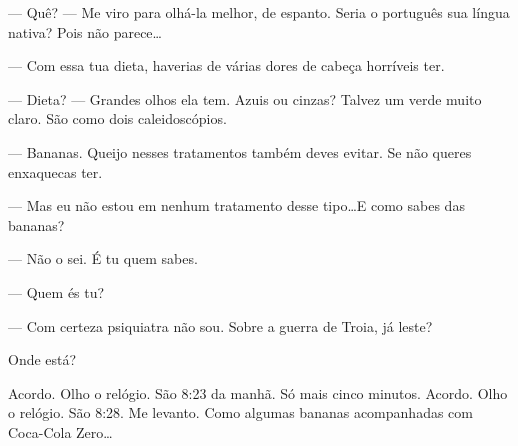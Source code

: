 --- Quê? --- Me viro para olhá-la melhor, de espanto. Seria o português sua língua nativa? Pois não parece\ldots

--- Com essa tua dieta, haverias de várias dores de cabeça horríveis ter.

--- Dieta? --- Grandes olhos ela tem. Azuis ou cinzas? Talvez um verde muito claro. São como dois caleidoscópios.

--- Bananas. Queijo nesses tratamentos também deves evitar. Se não queres enxaquecas ter.

--- Mas eu não estou em nenhum tratamento desse tipo\ldots\linebreak E como sabes das bananas?

--- Não o sei. É tu quem sabes.

--- Quem és tu?

\begin{sloppypar}
--- Com certeza psiquiatra não sou. Sobre a guerra de Troia, já leste?
\end{sloppypar}

Onde está?

Acordo. Olho o relógio. São 8:23 da manhã. Só mais cinco minutos. Acordo. Olho o relógio. São 8:28. Me levanto. Como algumas bananas acompanhadas com Coca-Cola Zero\ldots
